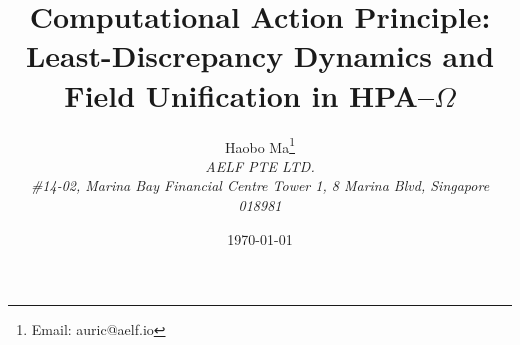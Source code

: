 \documentclass[11pt,a4paper]{article}
\title{Computational Action Principle: Least-Discrepancy Dynamics and Field Unification in HPA--$\Omega$}
\author{Haobo Ma\thanks{Email: auric@aelf.io} \\
\textit{AELF PTE LTD.} \\
\textit{\#14-02, Marina Bay Financial Centre Tower 1, 8 Marina Blvd, Singapore 018981}}
\date{\today}
\begin{document}
\maketitle
















\FloatBarrier
\appendix


\FloatBarrier

\end{document}
